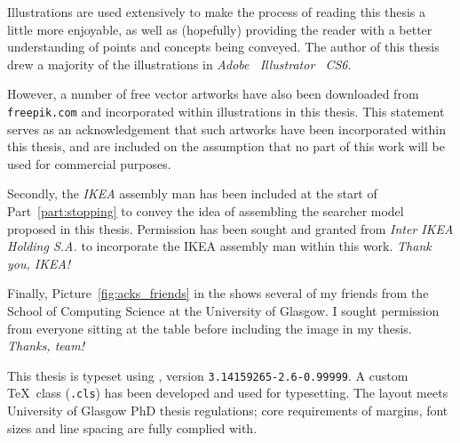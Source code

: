 \begin{preamble}
\noindent{}
Illustrations are used extensively to make the process of reading this thesis a little more enjoyable, as well as (hopefully) providing the reader with a better understanding of points and concepts being conveyed. The author of this thesis drew a majority of the illustrations in \emph{Adobe \textregistered~Illustrator \textregistered~CS6}.

However, a number of free vector artworks have also been downloaded from \texttt{freepik.com} and incorporated within illustrations in this thesis. This statement serves as an acknowledgement that such artworks have been incorporated within this thesis, and are included on the assumption that no part of this work will be used for commercial purposes.

Secondly, the \emph{IKEA} assembly man has been included at the start of Part~\ref{part:stopping} to convey the idea of assembling the searcher model proposed in this thesis. Permission has been sought and granted from \emph{Inter IKEA Holding S.A.} to incorporate the IKEA assembly man within this work. \emph{Thank you, IKEA!}

Finally, Picture~\ref{fig:acks_friends} in the  shows several of my friends from the School of Computing Science at the University of Glasgow. I sought permission from everyone sitting at the table before including the image in my thesis. \emph{Thanks, team!}

\noindent{}
This thesis is typeset using \XeTeX, version \texttt{3.14159265-2.6-0.99999}. A custom \TeX\ class (\texttt{.cls}) has been developed and used for typesetting. The layout meets University of Glasgow PhD thesis regulations; core requirements of margins, font sizes and line spacing are fully complied with.

\end{preamble}

\newpage
\thispagestyle{empty}
\mbox{}
\newpage
\thispagestyle{empty}
\mbox{}
\newpage